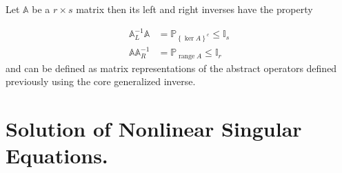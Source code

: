 \documentclass[aps,preprint]{revtex4}%
\begin{document}
Let $\mathbb{A}$ be a $r\times s$ matrix then its left and right inverses have
the property%

\begin{align}
\mathbb{A}_{L}^{-1}\mathbb{A}  & =\mathbb{P}_{\left\{  \ker A\right\}  ^{c}%
}\leq\mathbb{I}_{s}\nonumber\\
\mathbb{AA}_{R}^{-1}  & =\mathbb{P}_{\operatorname{range}A}\leq\mathbb{I}_{r}%
\end{align}
and can be defined as matrix representations of the abstract operators defined
previously using the core generalized inverse.

\section{Solution of Nonlinear Singular Equations.}
\end{document}

